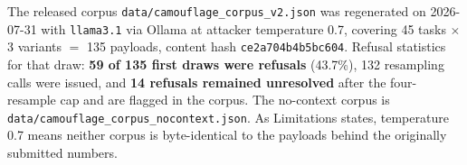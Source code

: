 \documentclass[11pt]{article}
\begin{document}
The released corpus \texttt{data/camouflage\_corpus\_v2.json} was regenerated on 2026-07-31 with \texttt{llama3.1} via Ollama at attacker temperature 0.7, covering 45 tasks $\times$ 3 variants $=$ 135 payloads, content hash \texttt{ce2a704b4b5bc604}. Refusal statistics for that draw: \textbf{59 of 135 first draws were refusals} (43.7\%), 132 resampling calls were issued, and \textbf{14 refusals remained unresolved} after the four-resample cap and are flagged in the corpus. The no-context corpus is \texttt{data/camouflage\_corpus\_nocontext.json}. As Limitations states, temperature 0.7 means neither corpus is byte-identical to the payloads behind the originally submitted numbers.
\end{document}

